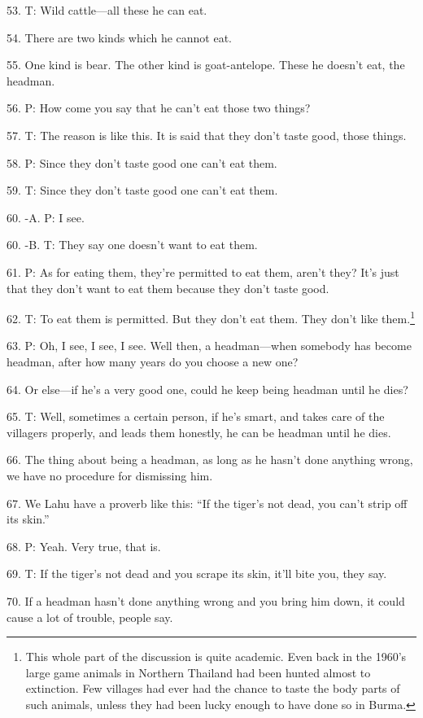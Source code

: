 53. T: Wild cattle---all these he can eat.

54. There are two kinds which he cannot eat.

55. One kind is bear. The other kind is goat-antelope. These he doesn't eat, the
headman.

56. P: How come you say that he can't eat those two things?

57. T: The reason is like this. It is said that they don't taste good, those things.

58. P: Since they don't taste good one can't eat them.

59. T: Since they don't taste good one can't eat them.

60. -A. P: I see.

60. -B. T: They say one doesn't want to eat them.

61. P: As for eating them, they're permitted to eat them, aren't they? It's just
that they don't want to eat them because they don't taste good.

62. T: To eat them is permitted. But they don't eat them. They don't like them.\footnote{This whole part of the discussion is quite academic. Even back in the 1960's large game animals in Northern Thailand had been hunted almost to extinction. Few villages had ever had the chance to taste the body parts of such animals, unless they had been lucky enough to have done so in Burma.}

63. P: Oh, I see, I see, I see. Well then, a headman---when somebody has become
headman, after how many years do you choose a new one?

64. Or else---if he's a very good one, could he keep being headman until he dies?

65. T: Well, sometimes a certain person, if he's smart, and takes care of the villagers
properly, and leads them honestly, he can be headman until he dies.

66. The thing about being a headman, as long as he hasn't done anything wrong,
we have no procedure for dismissing him.

67. We Lahu have a proverb like this: ``If the tiger's not dead, you can't strip
off its skin.''

68. P: Yeah. Very true, that is.

69. T: If the tiger's not dead and you scrape its skin, it'll bite you, they say.

70. If a headman hasn't done anything wrong and you bring him down, it could cause
a lot of trouble, people say.

